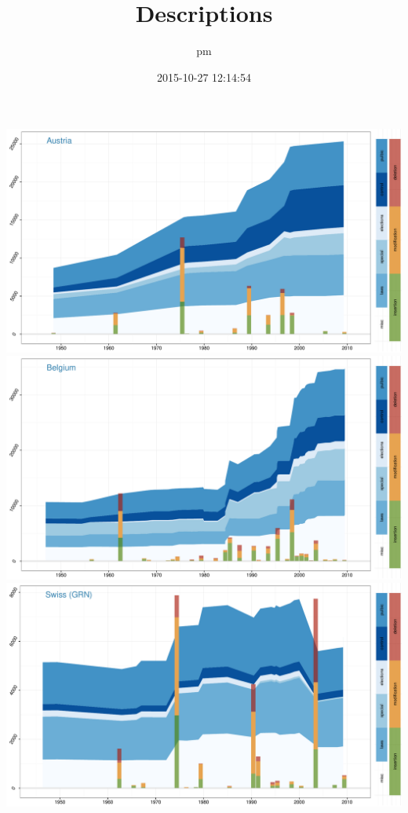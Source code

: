 \documentclass[a4paper, landscape]{article}
\title{Descriptions}
\author{pm}
\date{2015-10-27 12:14:54}
\begin{document}
\maketitle

\pagebreak{}

\includegraphics{country_graphs_files/figure-latex/unnamed-chunk-3-1.pdf}
\includegraphics{country_graphs_files/figure-latex/unnamed-chunk-3-2.pdf}
\includegraphics{country_graphs_files/figure-latex/unnamed-chunk-3-3.pdf}
\end{document}
